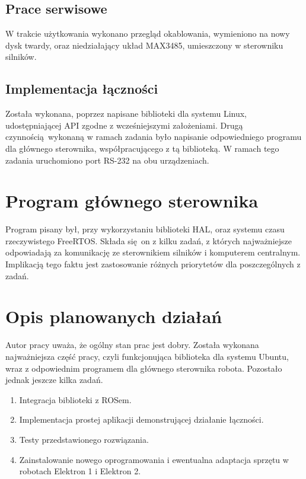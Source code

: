 \documentclass[a4paper, 12pt]{article}
\begin{document}
	\subsection{Prace serwisowe}
	W trakcie użytkowania wykonano przegląd okablowania, wymieniono na nowy dysk twardy, oraz niedziałający układ MAX3485, umieszczony w sterowniku silników.
	\subsection{Implementacja łączności}
	Została wykonana, poprzez napisane biblioteki dla systemu Linux, udostępniającej API zgodne z wcześniejszymi założeniami. Drugą czynnością wykonaną w ramach zadania było napisanie odpowiedniego programu dla głównego sterownika, współpracującego z tą biblioteką. W ramach tego zadania uruchomiono port RS-232 na obu urządzeniach.
	
	\section{Program głównego sterownika}
	Program pisany był, przy wykorzystaniu biblioteki HAL, oraz systemu czasu rzeczywistego FreeRTOS. Składa się on z kilku zadań, z których najważniejsze odpowiadają za komunikację ze sterownikiem silników i komputerem centralnym. Implikacją tego faktu jest zastosowanie różnych priorytetów dla poszczególnych z zadań.

	\section{Opis planowanych działań}
	Autor pracy uważa, że ogólny stan prac jest dobry. Została wykonana najważniejsza część pracy, czyli funkcjonująca biblioteka dla systemu Ubuntu, wraz z odpowiednim programem dla głównego sterownika robota. Pozostało jednak jeszcze kilka zadań.
	\begin{enumerate}
		\item Integracja biblioteki z ROSem.
		\item Implementacja prostej aplikacji demonstrującej działanie łączności.
		\item Testy przedstawionego rozwiązania. 
		\item Zainstalowanie nowego oprogramowania i ewentualna adaptacja sprzętu w robotach Elektron 1 i Elektron 2. \
	\end{enumerate}
	 
	
\end{document}
